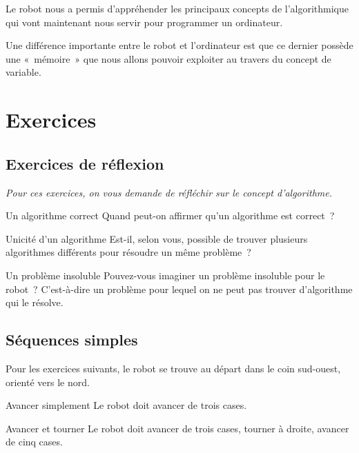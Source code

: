 	Le robot nous a permis d’appréhender les principaux
	concepts de l’algorithmique qui vont maintenant nous
	servir pour programmer un ordinateur. 
	
	Une différence importante entre le robot et
	l’ordinateur est que ce dernier possède une
	«~mémoire~» que nous allons pouvoir exploiter au travers du concept de
	variable.

\section{Exercices}

	\subsection{Exercices de réflexion}

		\textit{
		Pour ces exercices, on vous demande de réfléchir sur le concept
		d’algorithme.}

\begin{Exercice}{Un algorithme correct}
Quand peut-on affirmer qu’un algorithme est correct~?
\end{Exercice}

\begin{Exercice}{Unicité d’un algorithme}
	Est-il, selon vous, possible de trouver 
	plusieurs algorithmes différents
	pour résoudre un même problème~?
\end{Exercice}

\begin{Exercice}{Un problème insoluble}
	Pouvez-vous imaginer un problème insoluble pour le robot~?
	C’est-à-dire un problème pour lequel on ne peut pas
	trouver d’algorithme qui le résolve.
\end{Exercice}

	\subsection{Séquences simples}
	
		Pour les exercices suivants, le robot se trouve 
		au départ dans le coin sud-ouest, 
		orienté vers le nord.

\begin{Exercice}{Avancer simplement}
	Le robot doit avancer de trois cases.
\end{Exercice}

\begin{Exercice}{Avancer et tourner}
	Le robot doit avancer de trois cases, tourner à droite, 
	avancer de cinq cases.
\end{Exercice}

